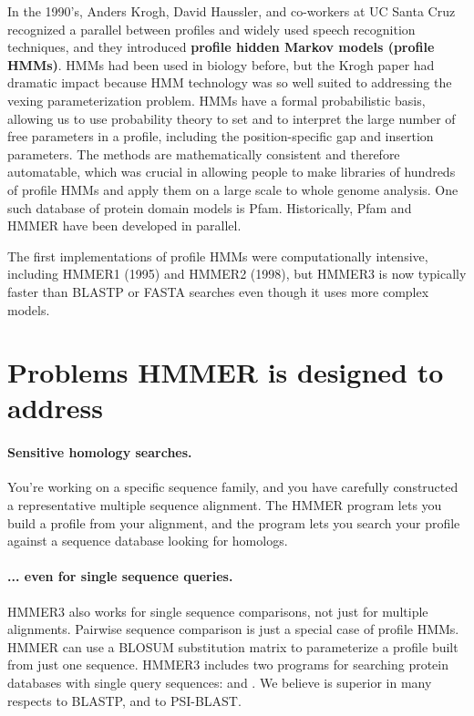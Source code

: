 In the 1990's, Anders Krogh, David Haussler, and co-workers at UC
Santa Cruz recognized a parallel between profiles and widely used
speech recognition techniques, and they introduced \textbf{profile
  hidden Markov models (profile HMMs)}.\cite{Krogh94} HMMs had been
used in biology before, but the Krogh paper had dramatic impact
because HMM technology was so well suited to addressing the vexing
parameterization problem. HMMs have a formal probabilistic basis,
allowing us to use probability theory to set and to interpret the
large number of free parameters in a profile, including the
position-specific gap and insertion parameters. The methods are
mathematically consistent and therefore automatable, which was crucial
in allowing people to make libraries of hundreds of profile HMMs and
apply them on a large scale to whole genome analysis.  One such
database of protein domain models is Pfam.\cite{Sonnhammer97}
Historically, Pfam and HMMER have been developed in parallel.

The first implementations of profile HMMs were computationally
intensive, including HMMER1 (1995) and HMMER2 (1998), but HMMER3 is
now typically faster than BLASTP or FASTA searches even though it uses
more complex models.

\section{Problems HMMER is designed to address}

\paragraph{Sensitive homology searches.}
You're working on a specific sequence family, and you have carefully
constructed a representative multiple sequence alignment. The HMMER
 program lets you build a profile from your alignment,
and the  program lets you search your profile against
a sequence database looking for homologs.

\paragraph{... even for single sequence queries.}
HMMER3 also works for single sequence comparisons, not just for
multiple alignments. Pairwise sequence comparison is just a special
case of profile HMMs. HMMER can use a BLOSUM substitution matrix to
parameterize a profile built from just one sequence.  HMMER3 includes
two programs for searching protein databases with single query
sequences:  and . We believe
 is superior in many respects to BLASTP, and
 to PSI-BLAST.

